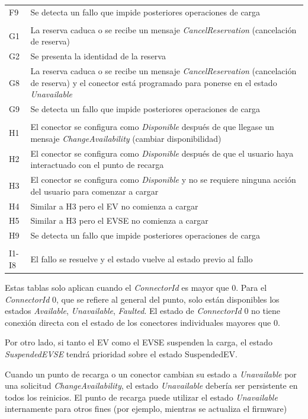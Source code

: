 \documentclass[12pt,a4paper,onecolumn,oneside]{report}
\begin{document}
\begin{longtable}{|p{1cm}|p{14cm}|}
F9 & Se detecta un fallo que impide posteriores operaciones de carga \\
 & \\
G1 & La reserva caduca o se recibe un mensaje \textit{CancelReservation} (cancelación de reserva)\\
G2 & Se presenta la identidad de la reserva\\
G8 &  La reserva caduca o se recibe un mensaje \textit{CancelReservation} (cancelación de reserva) y el conector está programado para ponerse en el estado \textit{Unavailable}\\
G9 & Se detecta un fallo que impide posteriores operaciones de carga \\
 & \\
H1 & El conector se configura como \textit{Disponible} después de que llegase un mensaje \textit{ChangeAvailability} (cambiar disponibilidad)\\
H2 & El conector se configura como \textit{Disponible} después de que el usuario haya interactuado con el punto de recarga\\
H3 & El conector se configura como \textit{Disponible} y no se requiere ninguna acción del usuario para comenzar a cargar\\
H4 & Similar a H3 pero el EV no comienza a cargar\\
H5 & Similar a H3 pero el EVSE no comienza a cargar\\
H9 & Se detecta un fallo que impide posteriores operaciones de carga \\
 & \\
I1-I8 & El fallo se resuelve y el estado vuelve al estado previo al fallo \\
\hline
\end{longtable}


Estas tablas solo aplican cuando el \textit{ConnectorId} es mayor que 0. Para el \textit{ConnectorId} 0, que se refiere al general del punto, solo están disponibles los estados \textit{Available}, \textit{Unavailable}, \textit{Faulted}. El estado de \textit{ConnectorId} 0 no tiene conexión directa con el estado de los conectores individuales mayores que 0.

Por otro lado, si tanto el EV como el EVSE suspenden la carga, el estado \textit{SuspendedEVSE} tendrá prioridad sobre el estado SuspendedEV.

Cuando un punto de recarga o un conector cambian su estado a \textit{Unavailable} por una solicitud \textit{ChangeAvailability}, el estado \textit{Unavailable} debería ser persistente en todos los reinicios. El punto de recarga puede utilizar el estado \textit{Unavailable} internamente para otros fines (por ejemplo, mientras se actualiza el firmware)
\end{document}
